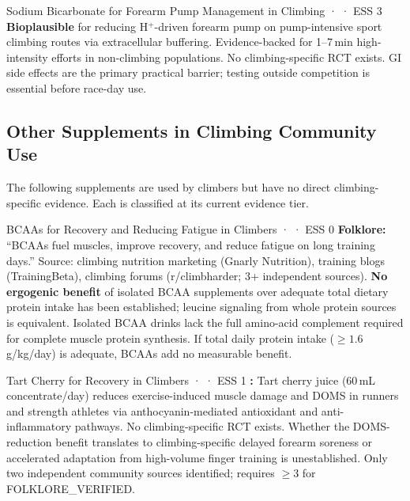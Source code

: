\begin{bioplausbox}{Sodium Bicarbonate for Forearm Pump Management in Climbing · \bioplausible · ESS 3}
\textbf{Bioplausible} for reducing H$^+$-driven forearm pump on pump-intensive sport climbing routes via extracellular buffering. Evidence-backed for 1--7\,min high-intensity efforts in non-climbing populations. No climbing-specific RCT exists. GI side effects are the primary practical barrier; testing outside competition is essential before race-day use.
\end{bioplausbox}

\subsection{Other Supplements in Climbing Community Use}
\label{subsec:othersupps}

The following supplements are used by climbers but have no direct climbing-specific evidence. Each is classified at its current evidence tier.

\begin{folklorebox}{BCAAs for Recovery and Reducing Fatigue in Climbers · \folkloreverified · ESS 0}
\textbf{Folklore:} ``BCAAs fuel muscles, improve recovery, and reduce fatigue on long training days.'' Source: climbing nutrition marketing (Gnarly Nutrition), training blogs (TrainingBeta), climbing forums (r/climbharder; 3+ independent sources). \textbf{No ergogenic benefit} of isolated BCAA supplements over adequate total dietary protein intake has been established; leucine signaling from whole protein sources is equivalent. Isolated BCAA drinks lack the full amino-acid complement required for complete muscle protein synthesis. If total daily protein intake (${\geq}1.6$\,g/kg/day) is adequate, BCAAs add no measurable benefit.
\end{folklorebox}

\begin{toverifybox}{Tart Cherry for Recovery in Climbers · \toverify · ESS 1}
\textbf{\toverify:} Tart cherry juice (60\,mL concentrate/day) reduces exercise-induced muscle damage and DOMS in runners and strength athletes via anthocyanin-mediated antioxidant and anti-inflammatory pathways. No climbing-specific RCT exists. Whether the DOMS-reduction benefit translates to climbing-specific delayed forearm soreness or accelerated adaptation from high-volume finger training is unestablished. Only two independent community sources identified; requires ${\geq}3$ for FOLKLORE\_VERIFIED.
\end{toverifybox}

